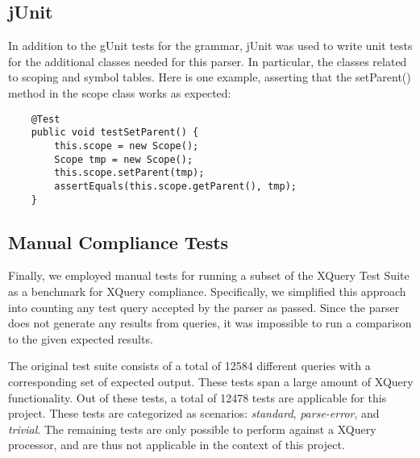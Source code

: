 \subsection{jUnit}
In addition to the gUnit tests for the grammar, jUnit was used to write unit tests for
the additional classes needed for this parser. In particular, the classes
related to scoping and symbol tables. Here is one example, asserting that the
setParent() method in the scope class works as expected:
\begin{Verbatim}
    @Test
    public void testSetParent() {
        this.scope = new Scope();
        Scope tmp = new Scope();
        this.scope.setParent(tmp);
        assertEquals(this.scope.getParent(), tmp);
    }
\end{Verbatim}

\subsection{Manual Compliance Tests}
Finally, we employed manual tests for running a subset of the XQuery Test
Suite\cite{w3c05} as a benchmark for XQuery compliance. Specifically, we
simplified this approach into counting any test query accepted by the parser as
passed. Since the parser does not generate any results from queries, it was
impossible to run a comparison to the given expected results.

The original test suite consists of a total of 12584 different queries with a
corresponding set of expected output. These tests span a large amount of XQuery
functionality. Out of these tests, a total of 12478 tests are applicable for
this project. These tests are categorized as scenarios: \emph{standard}, 
\emph{parse-error}, and \emph{trivial}. The remaining tests are only possible to
perform against a XQuery processor, and are thus not applicable in the context of this project.